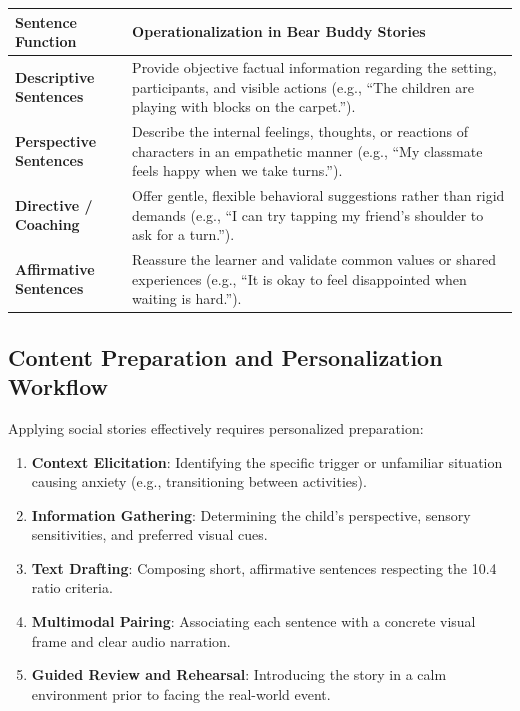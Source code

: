 \begin{xltabular}{\textwidth}{|p{4.0cm}|X|}
\hline
\textbf{Sentence Function} & \textbf{Operationalization in Bear Buddy Stories} \\ \hline
\endhead
\textbf{Descriptive Sentences} & Provide objective factual information regarding the setting, participants, and visible actions (e.g., ``The children are playing with blocks on the carpet.''). \\ \hline
\textbf{Perspective Sentences} & Describe the internal feelings, thoughts, or reactions of characters in an empathetic manner (e.g., ``My classmate feels happy when we take turns.''). \\ \hline
\textbf{Directive / Coaching} & Offer gentle, flexible behavioral suggestions rather than rigid demands (e.g., ``I can try tapping my friend's shoulder to ask for a turn.''). \\ \hline
\textbf{Affirmative Sentences} & Reassure the learner and validate common values or shared experiences (e.g., ``It is okay to feel disappointed when waiting is hard.''). \\ \hline
\end{xltabular}
\label{tab:c2_sentence_types}

\subsection{Content Preparation and Personalization Workflow}

Applying social stories effectively requires personalized preparation:
\begin{enumerate}
    \item \textbf{Context Elicitation}: Identifying the specific trigger or unfamiliar situation causing anxiety (e.g., transitioning between activities).
    \item \textbf{Information Gathering}: Determining the child's perspective, sensory sensitivities, and preferred visual cues.
    \item \textbf{Text Drafting}: Composing short, affirmative sentences respecting the 10.4 ratio criteria.
    \item \textbf{Multimodal Pairing}: Associating each sentence with a concrete visual frame and clear audio narration.
    \item \textbf{Guided Review and Rehearsal}: Introducing the story in a calm environment prior to facing the real-world event.
\end{enumerate}


